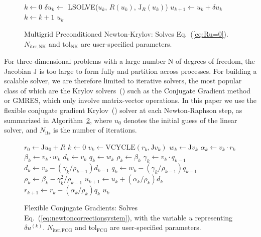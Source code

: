 %
\begin{figure}
\begin{algorithm}[H]
  \caption{\label{alg:newtonraphson}
    Multigrid Preconditioned Newton-Krylov: Solves Eq.~(\ref{eq:Ru=0}).$N_{\text{iter,NK}}$ and $\text{tol}_{\text{NK}}$ are user-specified parameters.
 }
    \begin{algorithmic}[1]
      \State $k \leftarrow 0$
       \State  $\delta u_k\leftarrow $ LSOLVE($u_k$, $R(u_k)$, $\mathrm{J}_R(u_k)$) 
       \State $u_{k+1} \leftarrow u_k + \delta u_k$
       \State $k \leftarrow k + 1$
       \EndWhile
       \State \Return $u_{k}$
      \EndProcedure 
    \end{algorithmic}
\end{algorithm}
\end{figure}

For three-dimensional problems with a large number $\mathrm{N}$ of
degrees of freedom, the Jacobian $\mathrm{J}$ is too large to form fully and partition across processes. For
building a scalable solver, we are therefore limited to iterative
solvers, the most popular class of which are the Krylov
solvers~(\citet*{saad2003iterative}) such as the Conjugate Gradient method or GMRES,
which only involve matrix-vector operations. In this paper we use the
flexible conjugate gradient Krylov~(\citet*{notay2000flexible}) solver at each
Newton-Raphson step, as summarized in Algorithm~\ref{alg:FCG}, where
$u_0$ denotes the initial guess of the linear solver, and
$N_{\text{its}}$ is the number of iterations.

\begin{figure}
  \begin{algorithm}[H]
    \caption{\label{alg:FCG}
    Flexible Conjugate Gradients: Solves Eq.~(\ref{eq:newtoncorrectionsystem}), with the variable $u$ representing $\delta u^{(k)}$. $N_{\text{iter,FCG}}$ and $\text{tol}_{\text{FCG}}$ are user-specified parameters.}%
    \begin{algorithmic}[1]
      \State $r_0 \leftarrow \mathrm{J}u_0 + R$
      \State $k \leftarrow 0$
      \State $v_k \leftarrow \text{VCYCLE}(r_k,\mathrm{J}v_k)$
      \State $w_k \leftarrow \mathrm{J}v_k$
      \State $\alpha_k \leftarrow v_k \cdot r_k$ 
      \State $\beta_k \leftarrow v_k \cdot w_k$
      \State $d_k \leftarrow v_k$
      \State $q_k \leftarrow w_k$
      \State $\rho_k \leftarrow \beta_k$
      \Else
      \State $\gamma_k \leftarrow v_k \cdot q_{k-1}$
      \State $d_k \leftarrow v_k - (\gamma_k/\rho_{k-1})d_{k-1}$
      \State $q_k \leftarrow w_k - (\gamma_k/\rho_{k-1})q_{k-1}$
      \State $\rho_k \leftarrow \beta_k - \gamma^2_k/\rho_{k-1}$
      \EndIf
      \State $u_{k+1} \leftarrow u_k + (\alpha_k/\rho_k)d_k$
      \State $r_{k+1} \leftarrow r_k - (\alpha_k/\rho_k)q_k$
      \EndWhile
      \State \Return $u_k$
      \EndFunction
    \end{algorithmic}
  \end{algorithm}
\end{figure}

